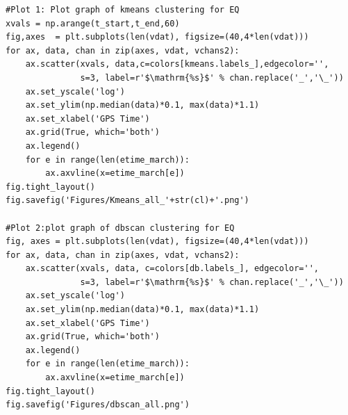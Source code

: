 \documentclass[colorlinks=true,pdfstartview=FitV,linkcolor=blue,
            citecolor=red,urlcolor=magenta]{ligodoc}
\begin{document}
\begin{verbatim}
#Plot 1: Plot graph of kmeans clustering for EQ
xvals = np.arange(t_start,t_end,60)
fig,axes  = plt.subplots(len(vdat), figsize=(40,4*len(vdat)))
for ax, data, chan in zip(axes, vdat, vchans2):
    ax.scatter(xvals, data,c=colors[kmeans.labels_],edgecolor='',
               s=3, label=r'$\mathrm{%s}$' % chan.replace('_','\_'))
    ax.set_yscale('log')
    ax.set_ylim(np.median(data)*0.1, max(data)*1.1)
    ax.set_xlabel('GPS Time')
    ax.grid(True, which='both')
    ax.legend()
    for e in range(len(etime_march)):
        ax.axvline(x=etime_march[e])
fig.tight_layout()
fig.savefig('Figures/Kmeans_all_'+str(cl)+'.png')

#Plot 2:plot graph of dbscan clustering for EQ
fig, axes = plt.subplots(len(vdat), figsize=(40,4*len(vdat)))
for ax, data, chan in zip(axes, vdat, vchans2):
    ax.scatter(xvals, data, c=colors[db.labels_], edgecolor='',
               s=3, label=r'$\mathrm{%s}$' % chan.replace('_','\_'))
    ax.set_yscale('log')
    ax.set_ylim(np.median(data)*0.1, max(data)*1.1)
    ax.set_xlabel('GPS Time')
    ax.grid(True, which='both')
    ax.legend()
    for e in range(len(etime_march)):
        ax.axvline(x=etime_march[e])
fig.tight_layout()
fig.savefig('Figures/dbscan_all.png')
\end{verbatim}
\end{document}

